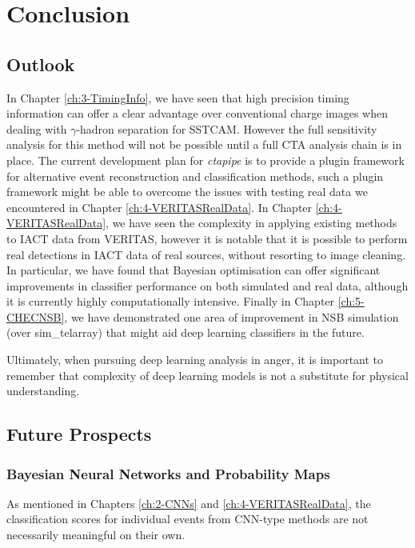 \chapter{\label{ch6-Conclusions} Conclusion}
\minitoc
\section{Outlook}

In Chapter \ref{ch:3-TimingInfo}, we have seen that high precision timing information can offer a clear advantage over conventional charge images when dealing with $\gamma$-hadron separation for SSTCAM. However the full sensitivity analysis for this method will not be possible until a full CTA analysis chain is in place. The current development plan for \textit{ctapipe} is to provide a plugin framework for alternative event reconstruction and classification methods, such a plugin framework might be able to overcome the issues with testing real data we encountered in Chapter \ref{ch:4-VERITASRealData}. In Chapter \ref{ch:4-VERITASRealData}, we have seen the complexity in applying existing methods to IACT data from VERITAS, however it is notable that it is possible to perform real detections in IACT data of real sources, without resorting to image cleaning. In particular, we have found that Bayesian optimisation can offer significant improvements in classifier performance on both simulated and real data, although it is currently highly computationally intensive. Finally in Chapter \ref{ch:5-CHECNSB}, we have demonstrated one area of improvement in NSB simulation (over sim\_telarray) that might aid deep learning classifiers in the future.

Ultimately, when pursuing deep learning analysis in anger, it is important to remember that complexity of deep learning models is not a substitute for physical understanding.

\section{Future Prospects}

\subsection{Bayesian Neural Networks and Probability Maps}

As mentioned in Chapters \ref{ch:2-CNNs} and \ref{ch:4-VERITASRealData}, the classification scores for individual events from CNN-type methods are not necessarily meaningful on their own.

